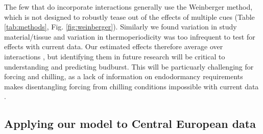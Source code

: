 \documentclass{article}
\begin{document}
The few that do incorporate interactions generally use the Weinberger method, which is not designed to robustly tease out of the effects of multiple cues (Table \ref{tab:methods}, Fig. \ref{fig:weinberger}).  Similarly we found variation in study material/tissue and variation in thermoperiodicity was too infrequent to test for effects with current data. Our estimated effects therefore average over interactions \citep{gelman2006}, but identifying them in future research will be critical to understanding and predicting budburst. This will be particuarly challenging for forcing and chilling, as a lack of information on endodormancy requirements makes  disentangling forcing from chilling conditions impossible with current data \citep{chuine2016}.



\subsection*{Applying our model to Central European data}
\end{document}
